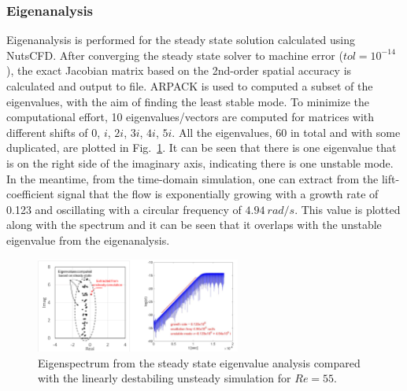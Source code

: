 \documentclass[journal,final]{new-aiaa}
\begin{document}
\subsubsection{Eigenanalysis}
Eigenanalysis is performed for the steady state solution calculated
using NutsCFD. After converging the steady state solver to machine error ($tol=10^{-14}$),
the exact Jacobian matrix based on the 2nd-order spatial accuracy is calculated and
output to file. {\color{red}ARPACK} is used to computed a subset of the eigenvalues, with the aim of
finding the least stable mode.
To minimize the computational effort, 10 eigenvalues/vectors
are computed for matrices with different shifts of $0$, $i$, $2i$, $3i$, $4i$, $5i$. All the
eigenvalues, 60 in total and with some duplicated, are plotted
in Fig.~\ref{fig:cyl-re55-eigen-vs-uns}.
It can be seen that there is one eigenvalue that is on the right side of the imaginary axis,
indicating there is one unstable mode. In the meantime, from the time-domain simulation,
one can extract from the lift-coefficient signal that the flow is exponentially growing with
a growth rate of 0.123 and oscillating with a circular frequency of $4.94~rad/s$. This
value is plotted along with the spectrum and it can be seen that it overlaps with the
unstable eigenvalue from the eigenanalysis. 

\begin{figure}[htb]
	\centering   
	\includegraphics[width=0.6\textwidth]{pic/uns-vs-eigen.png}	
	\caption{Eigenspectrum from the steady state eigenvalue analysis
		compared with the linearly destabiling unsteady simulation for $Re=55$.}
	\label{fig:cyl-re55-eigen-vs-uns}
\end{figure}
\end{document}
